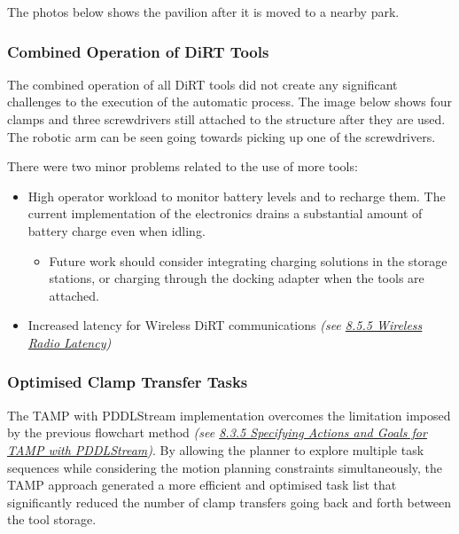 The photos below shows the pavilion after it is moved to a nearby park.




\subsubsection{Combined Operation of DiRT Tools}
\label{subsubsection:exploration-5-combined-operation-of-dirt-tools}

The combined operation of all DiRT tools did not create any significant challenges to the execution of the automatic process. The image below shows four clamps and three screwdrivers still attached to the structure after they are used. The robotic arm can be seen going towards picking up one of the screwdrivers.




There were two minor problems related to the use of more tools:

\begin{itemize}
	\item High operator workload to monitor battery levels and to recharge them. The current implementation of the electronics drains a substantial amount of battery charge even when idling.

\begin{itemize}
	\item Future work should consider integrating charging solutions in the storage stations, or charging through the docking adapter when the tools are attached.

\end{itemize}
	\item Increased latency for Wireless DiRT communications\textit{ (see \ul{8.5.5 Wireless Radio Latency})}

\end{itemize}

\subsubsection{Optimised Clamp Transfer Tasks}
\label{subsubsection:exploration-5-optimised-clamp-transfer-tasks}

The TAMP with PDDLStream implementation overcomes the limitation imposed by the previous flowchart method \textit{(see \ul{8.3.5 Specifying Actions and Goals for TAMP with PDDLStream})}. By allowing the planner to explore multiple task sequences while considering the motion planning constraints simultaneously, the TAMP approach generated a more efficient and optimised task list that significantly reduced the number of clamp transfers going back and forth between the tool storage. 


